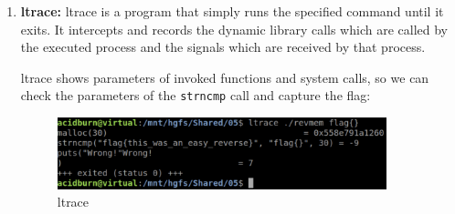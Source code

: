 \documentclass{article}
\begin{document}
\begin{enumerate}
\item{\textbf{ltrace:}}
ltrace is a program that simply runs the specified command until it exits.  It intercepts and records the 
dynamic library calls which are called by the executed process and the signals which are received by that process.

\noindent\linebreak
ltrace shows parameters of invoked functions and system calls, so we can check the parameters of the 
\texttt{strncmp} call and capture the flag:
\begin{figure}[H]
\centering
\includegraphics[width=0.9\textwidth]{img/ltrace.jpg}
\caption{ltrace}
\label{fig:ltrace}
\end{figure}
\end{enumerate}















\end{document}
